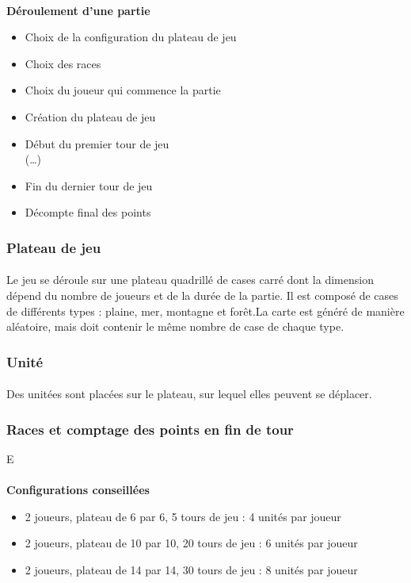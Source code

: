 \documentclass[a4paper]{article}
\begin{document}
\paragraph{}
\textbf{Déroulement d'une partie}
\begin{itemize}
    \item Choix de la configuration du plateau de jeu
    \item Choix des races
    \item Choix du joueur qui commence la partie
    \item Création du plateau de jeu
    \item Début du premier tour de jeu\\(\dots)
    \item Fin du dernier tour de jeu
    \item Décompte final des points
\end{itemize}

\subsubsection{Plateau de jeu}
\paragraph{}
Le jeu se déroule sur une plateau quadrillé de cases carré dont la dimension dépend du nombre de joueurs et de la durée de la partie.\label{map_gen} Il est composé de cases de différents types : plaine, mer, montagne et forêt.La carte est généré de manière aléatoire, mais doit contenir le même nombre de case de chaque type.

\subsubsection{Unité}
\paragraph{}
Des unitées sont placées sur le plateau, sur lequel elles peuvent se déplacer.

\subsubsection{Races et comptage des points en fin de tour}
E
\paragraph{}
\textbf{Configurations conseillées}
\begin{itemize}
    \item 2 joueurs, plateau de 6 par 6, 5 tours de jeu : 4 unités par joueur
    \item 2 joueurs, plateau de 10 par 10, 20 tours de jeu : 6 unités par joueur
    \item 2 joueurs, plateau de 14 par 14, 30 tours de jeu : 8 unités par joueur
\end{itemize}
\end{document}
